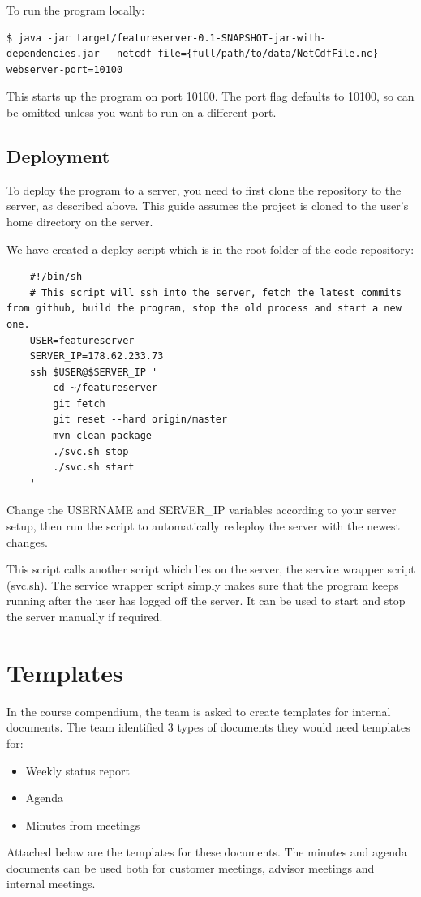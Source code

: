 \documentclass[11pt,a4paper,titlepage,oneside]{report}
\begin{document}
To run the program locally:
\begin{lstlisting}
$ java -jar target/featureserver-0.1-SNAPSHOT-jar-with-dependencies.jar --netcdf-file={full/path/to/data/NetCdfFile.nc} --webserver-port=10100
\end{lstlisting}

This starts up the program on port 10100. The port flag defaults to 10100, so can be omitted unless you want to run on a different port.

\section{Deployment}
To deploy the program to a server, you need to first clone the repository to the server, as described above.
This guide assumes the project is cloned to the user's home directory on the server.

We have created a deploy-script which is in the root folder of the code repository:
\begin{lstlisting}
	#!/bin/sh
	# This script will ssh into the server, fetch the latest commits from github, build the program, stop the old process and start a new one.
	USER=featureserver
	SERVER_IP=178.62.233.73
	ssh $USER@$SERVER_IP '
	    cd ~/featureserver
	    git fetch
	    git reset --hard origin/master
	    mvn clean package
	    ./svc.sh stop
	    ./svc.sh start
	'
\end{lstlisting}

Change the USERNAME and SERVER\_IP variables according to your server setup, then run the script to automatically redeploy the server with the newest changes.

This script calls another script which lies on the server, the service wrapper script (svc.sh).
The service wrapper script simply makes sure that the program keeps running after the user has logged off the server. It can be used to start and stop the server manually if required.

\chapter{Templates}
In the \gls{course compendium}, the team is asked to create templates for internal documents. The team identified 3 types of documents they would need templates for:

\begin{itemize}
\item Weekly status report
\item Agenda
\item Minutes from meetings
\end{itemize}

Attached below are the templates for these documents. The minutes and agenda documents can be used both for customer meetings, advisor meetings and internal meetings.




\end{document}
